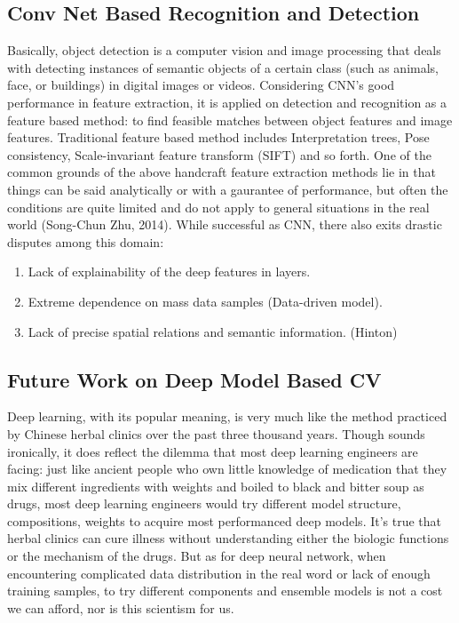 \subsection{Conv Net Based Recognition and Detection}
Basically, object detection is a computer vision and image processing that deals with detecting instances of semantic objects of a certain class (such as animals, face, or buildings) in digital images or videos. Considering {CNN}'s good performance in feature extraction, it is applied on detection and recognition as a feature based method: to find feasible matches between object features and image features. Traditional feature based method includes {Interpretation trees, Pose consistency, Scale-invariant feature transform (SIFT)} and so forth. One of the common grounds of the above handcraft feature extraction methods lie in that things can be said analytically or with a gaurantee of performance, but often the conditions are quite limited and do not apply to general situations in the real world {(Song-Chun Zhu, 2014)}. While successful as {CNN}, there also exits drastic disputes among this domain:
 \begin{enumerate}
    \item Lack of explainability of the deep features in layers.
    \item Extreme dependence on mass data samples (Data-driven model).
    \item Lack of precise spatial relations and semantic information. ({{Hinton}})

 \end{enumerate}

\subsection{Future Work on Deep Model Based CV}
Deep learning, with its popular meaning, is very much like the method practiced by Chinese herbal clinics over the past three thousand years\cite{lecun2015deep}. Though sounds ironically, it does reflect the dilemma that most deep learning engineers are facing: just like ancient people who own little knowledge of medication that they mix different ingredients with weights and boiled to black and bitter soup as drugs, most deep learning engineers would try different model structure, compositions, weights to acquire most performanced deep models. It's true that herbal clinics can cure illness without understanding either the biologic functions or the mechanism of the drugs. But as for {deep neural network}, when encountering complicated data distribution in the real word or lack of enough training samples, to try different components and ensemble models is not a cost we can afford, nor is this scientism for us.

